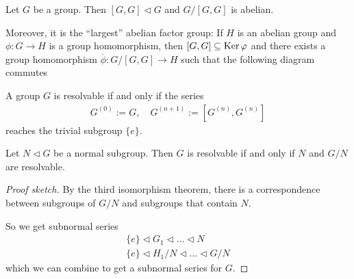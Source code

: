 \begin{prop}[]
  Let $G$ be a group. Then $[G,G] \lhd G$ and $G/[G,G]$ is abelian.

  Moreover, it is the ``largest'' abelian factor group:
  If $H$ is an abelian group and $\phi: G \to  H$ is a group homomorphism, then
  $[G,G] \subseteq \operatorname{Ker} \varphi$ and there exists a group homomorphism $\overline{\phi}: G/[G,G] \to  H$ such that the following diagram commutes

  \begin{center}
  \end{center}
\end{prop}

\begin{cor}[]
  A group $G$ is resolvable if and only if the series
  \begin{align*}
    G^{(0)} := G, \quad G^{(n+1)} := [G^{(n)},G^{(n)}]
  \end{align*}
  reaches the trivial subgroup $\{e\}$.
\end{cor}

\begin{prop}
  Let $N \lhd G$ be a normal subgroup.
  Then $G$ is resolvable if and only if $N$ and $G/N$ are resolvable.

\end{prop}
\begin{proof}[Proof sketch]
  By the third isomorphism theorem, there is a correspondence between subgroups of $G/N$ and subgroups that contain $N$.

  So we get subnormal series
  \begin{align*}
    \{e\} \lhd  G_1 \lhd \ldots \lhd N\\
    \{e\} \lhd  H_1/N \lhd  \ldots \lhd G/N
  \end{align*}
  which we can combine to get a subnormal series for $G$.
\end{proof}



